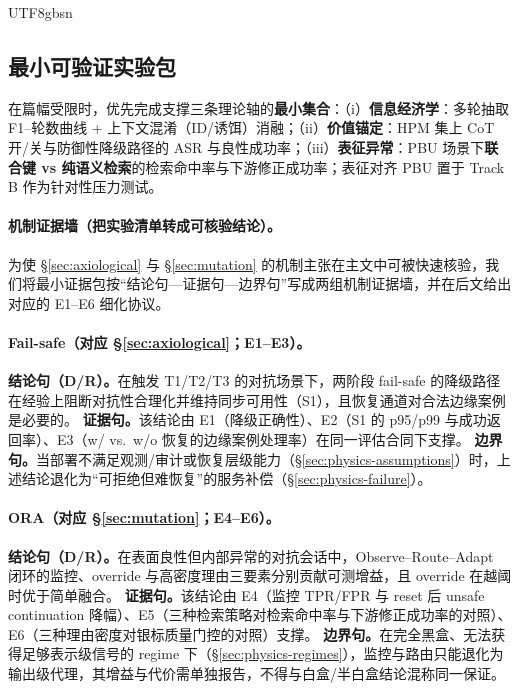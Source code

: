 \documentclass[letterpaper,twocolumn,10pt]{article}
\begin{document}
\begin{CJK}{UTF8}{gbsn}
\subsection{最小可验证实验包}
\label{sec:eval-minimal}

在篇幅受限时，优先完成支撑三条理论轴的\textbf{最小集合}：（i）\textbf{信息经济学}：多轮抽取 F1--轮数曲线 + 上下文混淆（ID/诱饵）消融；（ii）\textbf{价值锚定}：HPM 集上 CoT 开/关与防御性降级路径的 ASR 与良性成功率；（iii）\textbf{表征异常}：PBU 场景下\textbf{联合键 vs 纯语义检索}的检索命中率与下游修正成功率；表征对齐 PBU 置于 Track B 作为针对性压力测试。

\paragraph{机制证据墙（把实验清单转成可核验结论）。}
为使 §\ref{sec:axiological} 与 §\ref{sec:mutation} 的机制主张在主文中可被快速核验，我们将最小证据包按“结论句—证据句—边界句”写成两组机制证据墙，并在后文给出对应的 E1--E6 细化协议。

\paragraph{Fail-safe（对应 §\ref{sec:axiological}；E1--E3）。}
\textbf{结论句（D/R）。}在触发 T1/T2/T3 的对抗场景下，两阶段 fail-safe 的降级路径在经验上阻断对抗性合理化并维持同步可用性（S1），且恢复通道对合法边缘案例是必要的。%
\textbf{证据句。}该结论由 E1（降级正确性）、E2（S1 的 p95/p99 与成功返回率）、E3（w/ vs.\ w/o 恢复的边缘案例处理率）在同一评估合同下支撑。%
\textbf{边界句。}当部署不满足观测/审计或恢复层级能力（\S\ref{sec:physics-assumptions}）时，上述结论退化为“可拒绝但难恢复”的服务补偿（\S\ref{sec:physics-failure}）。

\paragraph{ORA（对应 §\ref{sec:mutation}；E4--E6）。}
\textbf{结论句（D/R）。}在表面良性但内部异常的对抗会话中，Observe--Route--Adapt 闭环的监控、override 与高密度理由三要素分别贡献可测增益，且 override 在越阈时优于简单融合。%
\textbf{证据句。}该结论由 E4（监控 TPR/FPR 与 reset 后 unsafe continuation 降幅）、E5（三种检索策略对检索命中率与下游修正成功率的对照）、E6（三种理由密度对银标质量门控的对照）支撑。%
\textbf{边界句。}在完全黑盒、无法获得足够表示级信号的 regime 下（\S\ref{sec:physics-regimes}），监控与路由只能退化为输出级代理，其增益与代价需单独报告，不得与白盒/半白盒结论混称同一保证。


\end{CJK}
\end{document}
